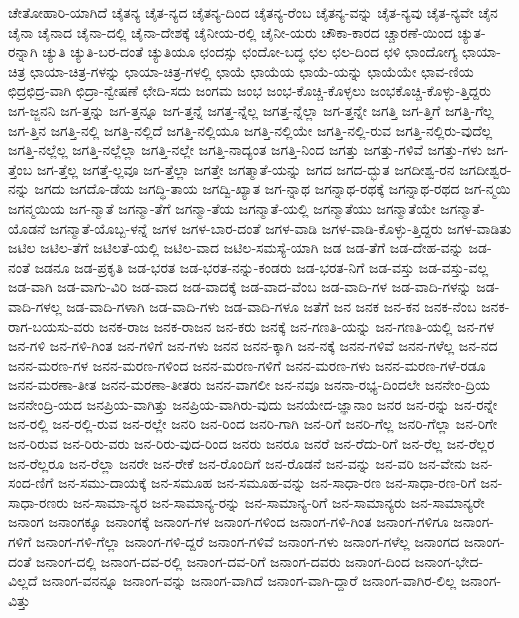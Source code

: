 {ಚೇತೋಹಾರಿ-ಯಾಗಿದೆ
ಚೈತನ್ಯ
ಚೈತ-ನ್ಯದ
ಚೈತನ್ಯ-ದಿಂದ
ಚೈತನ್ಯ-ರೆಂಬ
ಚೈತನ್ಯ-ವನ್ನು
ಚೈತ-ನ್ಯವು
ಚೈತ-ನ್ಯವೇ
ಚೈನ
ಚೈನಾ
ಚೈನಾದ
ಚೈನಾ-ದಲ್ಲಿ
ಚೈನಾ-ದೇಶಕ್ಕೆ
ಚೈನೀಯ-ರಲ್ಲಿ
ಚೈನೀ-ಯರು
ಚೌಕಾ-ಕಾರದ
ಚ್ಚಾರಣೆ-ಯಿಂದ
ಚ್ಯುತ-ರನ್ನಾಗಿ
ಚ್ಯುತಿ
ಚ್ಯುತಿ-ಬರ-ದಂತೆ
ಚ್ಯುತಿಯೂ
ಛಂದಸ್ಸು
ಛಂದೋ-ಬದ್ಧ
ಛಲ
ಛಲ-ದಿಂದ
ಛಳಿ
ಛಾಂದೋಗ್ಯ
ಛಾಯಾ-ಚಿತ್ರ
ಛಾಯಾ-ಚಿತ್ರ-ಗಳನ್ನು
ಛಾಯಾ-ಚಿತ್ರ-ಗಳಲ್ಲಿ
ಛಾಯೆ
ಛಾಯೆಯ
ಛಾಯೆ-ಯನ್ನು
ಛಾಯೆಯೇ
ಛಾವ-ಣಿಯ
ಛಿದ್ರಛಿದ್ರ-ವಾಗಿ
ಛಿದ್ರಾ-ನ್ವೇಷಣೆ
ಛೇದಿ-ಸದು
ಜಂಗಮ
ಜಂಭ
ಜಂಭ-ಕೊಚ್ಚಿ-ಕೊಳ್ಳಲು
ಜಂಭಕೊಚ್ಚಿ-ಕೊಳ್ಳು-ತ್ತಿದ್ದರು
ಜಗ-ಜ್ಜನನಿ
ಜಗ-ತ್ತನ್ನು
ಜಗ-ತ್ತನ್ನೂ
ಜಗ-ತ್ತನ್ನೆ
ಜಗತ್ತ-ನ್ನೆಲ್ಲ
ಜಗತ್ತ-ನ್ನೆಲ್ಲಾ
ಜಗ-ತ್ತನ್ನೇ
ಜಗತ್ತಿ
ಜಗ-ತ್ತಿಗೆ
ಜಗತ್ತಿ-ಗೆಲ್ಲ
ಜಗ-ತ್ತಿನ
ಜಗತ್ತಿ-ನಲ್ಲಿ
ಜಗತ್ತಿ-ನಲ್ಲಿದೆ
ಜಗತ್ತಿ-ನಲ್ಲಿಯೂ
ಜಗತ್ತಿ-ನಲ್ಲಿಯೇ
ಜಗತ್ತಿ-ನಲ್ಲಿ-ರುವ
ಜಗತ್ತಿ-ನಲ್ಲಿರು-ವುದೆಲ್ಲ
ಜಗತ್ತಿ-ನಲ್ಲೆಲ್ಲ
ಜಗತ್ತಿ-ನಲ್ಲೆಲ್ಲಾ
ಜಗತ್ತಿ-ನಲ್ಲೇ
ಜಗತ್ತಿ-ನಾದ್ಯಂತ
ಜಗತ್ತಿ-ನಿಂದ
ಜಗತ್ತು
ಜಗತ್ತು-ಗಳಿವೆ
ಜಗತ್ತು-ಗಳು
ಜಗ-ತ್ತೆಂಬ
ಜಗ-ತ್ತೆಲ್ಲ
ಜಗತ್ತೆ-ಲ್ಲವೂ
ಜಗ-ತ್ತೆಲ್ಲಾ
ಜಗತ್ತೇ
ಜಗತ್ಮಾತೆ-ಯನ್ನು
ಜಗದ
ಜಗದ-ದ್ಭುತ
ಜಗದೀಶ್ವ-ರನ
ಜಗದೀಶ್ವರ-ನನ್ನು
ಜಗದು
ಜಗದೊ-ಡೆಯ
ಜಗದ್ಧಿ-ತಾಯ
ಜಗದ್ವಿ-ಖ್ಯಾತ
ಜಗ-ನ್ನಾಥ
ಜಗನ್ನಾಥ-ರಥಕ್ಕೆ
ಜಗನ್ನಾಥ-ರಥದ
ಜಗ-ನ್ಮಯಿ
ಜಗನ್ಮಯಿಯ
ಜಗ-ನ್ಮಾತೆ
ಜಗನ್ಮಾ-ತೆಗೆ
ಜಗನ್ಮಾ-ತೆಯ
ಜಗನ್ಮಾತೆ-ಯಲ್ಲಿ
ಜಗನ್ಮಾತೆಯು
ಜಗನ್ಮಾತೆಯೇ
ಜಗನ್ಮಾತೆ-ಯೊಡನೆ
ಜಗನ್ಮಾತೆ-ಯೊಬ್ಬ-ಳನ್ನೆ
ಜಗಳ
ಜಗಳ-ಬಾರ-ದಂತೆ
ಜಗಳ-ವಾಡಿ
ಜಗಳ-ವಾಡಿ-ಕೊಳ್ಳು-ತ್ತಿದ್ದರು
ಜಗಳ-ವಾಡಿತು
ಜಟಿಲ
ಜಟಿಲ-ತೆಗೆ
ಜಟಿಲತೆ-ಯಲ್ಲಿ
ಜಟಿಲ-ವಾದ
ಜಟಿಲ-ಸಮಸ್ಯೆ-ಯಾಗಿ
ಜಡ
ಜಡ-ತೆಗೆ
ಜಡ-ದೇಹ-ವನ್ನು
ಜಡ-ನಂತೆ
ಜಡನೂ
ಜಡ-ಪ್ರಕೃತಿ
ಜಡ-ಭರತ
ಜಡ-ಭರತ-ನನ್ನು-ಕಂಡರು
ಜಡ-ಭರತ-ನಿಗೆ
ಜಡ-ವಸ್ತು
ಜಡ-ವಸ್ತು-ವಲ್ಲ
ಜಡ-ವಾಗಿ
ಜಡ-ವಾಗು-ವಿರಿ
ಜಡ-ವಾದ
ಜಡ-ವಾದಕ್ಕೆ
ಜಡ-ವಾದ-ವೆಂಬ
ಜಡ-ವಾದಿ-ಗಳ
ಜಡ-ವಾದಿ-ಗಳನ್ನು
ಜಡ-ವಾದಿ-ಗಳಲ್ಲ
ಜಡ-ವಾದಿ-ಗಳಾಗಿ
ಜಡ-ವಾದಿ-ಗಳು
ಜಡ-ವಾದಿ-ಗಳೂ
ಜತೆಗೆ
ಜನ
ಜನಕ
ಜನ-ಕನ
ಜನಕ-ನೆಂಬ
ಜನಕ-ರಾಗ-ಬಯಸು-ವರು
ಜನಕ-ರಾಜ
ಜನಕ-ರಾಜನ
ಜನ-ಕರು
ಜನಕ್ಕೆ
ಜನ-ಗಣತಿ-ಯನ್ನು
ಜನ-ಗಣತಿ-ಯಲ್ಲಿ
ಜನ-ಗಳ
ಜನ-ಗಳಿ
ಜನ-ಗಳಿ-ಗಿಂತ
ಜನ-ಗಳಿಗೆ
ಜನ-ಗಳು
ಜನನ
ಜನನ-ಕ್ಕಾಗಿ
ಜನ-ನಕ್ಕೆ
ಜನನ-ಗಳಿವೆ
ಜನನ-ಗಳೆಲ್ಲ
ಜನ-ನದ
ಜನನ-ಮರಣ-ಗಳ
ಜನನ-ಮರಣ-ಗಳಿಂದ
ಜನನ-ಮರಣ-ಗಳಿಗೆ
ಜನನ-ಮರಣ-ಗಳು
ಜನನ-ಮರಣ-ಗಳೆ-ರಡೂ
ಜನನ-ಮರಣಾ-ತೀತ
ಜನನ-ಮರಣಾ-ತೀತರು
ಜನನ-ವಾಗಲೀ
ಜನ-ನವೂ
ಜನನಾ-ರಭ್ಯ-ದಿಂದಲೇ
ಜನನೇಂ-ದ್ರಿಯ
ಜನನೇಂದ್ರಿ-ಯದ
ಜನಪ್ರಿಯ-ವಾಗಿತ್ತು
ಜನಪ್ರಿಯ-ವಾಗಿರು-ವುದು
ಜನಯೇದ-ಜ್ಞಾನಾಂ
ಜನರ
ಜನ-ರನ್ನು
ಜನ-ರನ್ನೇ
ಜನ-ರಲ್ಲಿ
ಜನ-ರಲ್ಲಿ-ರುವ
ಜನ-ರಲ್ಲೇ
ಜನರಿ
ಜನ-ರಿಂದ
ಜನರಿ-ಗಾಗಿ
ಜನ-ರಿಗೆ
ಜನರಿ-ಗೆಲ್ಲ
ಜನರಿ-ಗೆಲ್ಲಾ
ಜನ-ರಿಗೇ
ಜನ-ರಿರುವ
ಜನ-ರಿರು-ವರು
ಜನ-ರಿರು-ವುದ-ರಿಂದ
ಜನರು
ಜನರೂ
ಜನರೆ
ಜನ-ರೆದು-ರಿಗೆ
ಜನ-ರೆಲ್ಲ
ಜನ-ರೆಲ್ಲರ
ಜನ-ರೆಲ್ಲರೂ
ಜನ-ರೆಲ್ಲಾ
ಜನರೇ
ಜನ-ರೇಕೆ
ಜನ-ರೊಂದಿಗೆ
ಜನ-ರೊಡನೆ
ಜನ-ವನ್ನು
ಜನ-ವರಿ
ಜನ-ವೇನು
ಜನ-ಸಂದ-ಣಿಗೆ
ಜನ-ಸಮು-ದಾಯಕ್ಕೆ
ಜನ-ಸಮೂಹ
ಜನ-ಸಮೂಹ-ವನ್ನು
ಜನ-ಸಾಧಾ-ರಣ
ಜನ-ಸಾಧಾ-ರಣ-ರಿಗೆ
ಜನ-ಸಾಧಾ-ರಣರು
ಜನ-ಸಾಮಾ-ನ್ಯರ
ಜನ-ಸಾಮಾನ್ಯ-ರನ್ನು
ಜನ-ಸಾಮಾನ್ಯ-ರಿಗೆ
ಜನ-ಸಾಮಾನ್ಯರು
ಜನ-ಸಾಮಾನ್ಯರೇ
ಜನಾಂಗ
ಜನಾಂಗಕ್ಕೂ
ಜನಾಂಗಕ್ಕೆ
ಜನಾಂಗ-ಗಳ
ಜನಾಂಗ-ಗಳಿಂದ
ಜನಾಂಗ-ಗಳಿ-ಗಿಂತ
ಜನಾಂಗ-ಗಳಿಗೂ
ಜನಾಂಗ-ಗಳಿಗೆ
ಜನಾಂಗ-ಗಳಿ-ಗೆಲ್ಲಾ
ಜನಾಂಗ-ಗಳಿ-ದ್ದರೆ
ಜನಾಂಗ-ಗಳಿವೆ
ಜನಾಂಗ-ಗಳು
ಜನಾಂಗ-ಗಳೆಲ್ಲ
ಜನಾಂಗದ
ಜನಾಂಗ-ದಂತೆ
ಜನಾಂಗ-ದಲ್ಲಿ
ಜನಾಂಗ-ದವ-ರಲ್ಲಿ
ಜನಾಂಗ-ದವ-ರಿಗೆ
ಜನಾಂಗ-ದವರು
ಜನಾಂಗ-ದಿಂದ
ಜನಾಂಗ-ಭೇದ-ವಿಲ್ಲದೆ
ಜನಾಂಗ-ವನನ್ನೂ
ಜನಾಂಗ-ವನ್ನು
ಜನಾಂಗ-ವಾಗಿದೆ
ಜನಾಂಗ-ವಾಗಿ-ದ್ದಾರೆ
ಜನಾಂಗ-ವಾಗಿರ-ಲಿಲ್ಲ
ಜನಾಂಗ-ವಿತ್ತು
}
